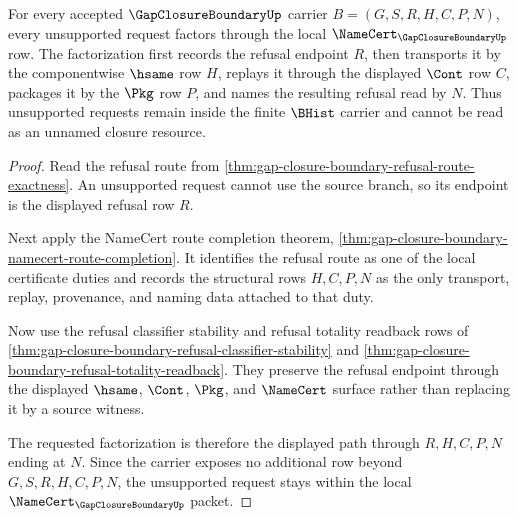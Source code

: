 \begin{theorem}
\label{thm:gap-closure-boundary-refusal-namecert-factorization}
For every accepted $\GapClosureBoundaryUp$ carrier $B=(G,S,R,H,C,P,N)$, every unsupported request factors through the local $\NameCert_{\GapClosureBoundaryUp}$ row. The factorization first records the refusal endpoint $R$, then transports it by the componentwise $\hsame$ row $H$, replays it through the displayed $\Cont$ row $C$, packages it by the $\Pkg$ row $P$, and names the resulting refusal read by $N$. Thus unsupported requests remain inside the finite $\BHist$ carrier and cannot be read as an unnamed closure resource.
\end{theorem}
\begin{proof}
Read the refusal route from \autoref{thm:gap-closure-boundary-refusal-route-exactness}. An unsupported request cannot use the source branch, so its endpoint is the displayed refusal row $R$.

Next apply the NameCert route completion theorem, \autoref{thm:gap-closure-boundary-namecert-route-completion}. It identifies the refusal route as one of the local certificate duties and records the structural rows $H,C,P,N$ as the only transport, replay, provenance, and naming data attached to that duty.

Now use the refusal classifier stability and refusal totality readback rows of \autoref{thm:gap-closure-boundary-refusal-classifier-stability} and \autoref{thm:gap-closure-boundary-refusal-totality-readback}. They preserve the refusal endpoint through the displayed $\hsame$, $\Cont$, $\Pkg$, and $\NameCert$ surface rather than replacing it by a source witness.

The requested factorization is therefore the displayed path through $R,H,C,P,N$ ending at $N$. Since the carrier exposes no additional row beyond $G,S,R,H,C,P,N$, the unsupported request stays within the local $\NameCert_{\GapClosureBoundaryUp}$ packet.
\end{proof}

